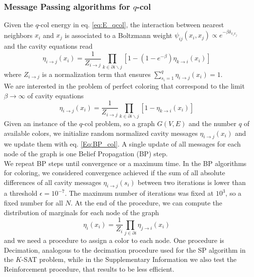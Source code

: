 \documentclass{article}
\begin{document}
\subsubsection{Message Passing algorithms for $q$-col}
Given the $q$-col energy in eq. \eqref{eq:E_qcol},
the interaction between nearest neighbors $x_i$ and $x_j$ is associated to a Boltzmann weight $\psi_{ij}(x_i,x_j) \propto e^{-\beta \delta_{x_i x_j}}$ and the cavity equations read \cite{Pearl1982}
\begin{equation}
    \eta_{i \rightarrow j} (x_i) = \frac{1}{Z_{i \rightarrow j}} \prod_{k \in \partial i\backslash j} [1-(1-e^{-\beta})\eta_{k \rightarrow i}(x_i)]
\end{equation} 
where $Z_{i \rightarrow j}$ is a normalization term that ensures $\sum_{s_i=1}^q \eta_{i\rightarrow j}(x_i) = 1$.
\\We are interested in the problem of perfect coloring that correspond to the limit $\beta \rightarrow \infty$ of cavity equations
\begin{equation}
    \eta_{i \rightarrow j} (x_i) = \frac{1}{Z_{i \rightarrow j}} \prod_{k \in \partial i\backslash j} [1-\eta_{k \rightarrow i}(x_i)]
    \label{Eq:BP_col}
\end{equation}
Given an instance of the $q$-col problem, so a graph $G(V,E)$ and the number $q$ of available colors, we initialize random normalized cavity messages $\eta_{i\rightarrow j}(x_i)$ and we update them with eq. \eqref{Eq:BP_col}. A single update of all messages for each node of the graph is one Belief Propagation (BP) step. 
\\We repeat BP steps until convergence or a maximum time. In the BP algorithms for coloring, we considered convergence achieved if the sum of all absolute differences of all cavity messages $\eta_{i\rightarrow j}(s_i)$ between two iterations is lower than a threshold $\epsilon=10^{-7}$. The maximum number of iterations was fixed at $10^3$, so a fixed number for all $N$. At the end of the procedure, we can compute the distribution of marginals for each node of the graph
\begin{equation}
    \eta_i(x_i) = \frac{1}{Z_i} \prod_{j\in \partial i} \eta_{j \rightarrow i} (x_i)
\end{equation}
and we need a procedure to assign a color to each node. One procedure is Decimation, analogous to the decimation procedure used for the SP algorithm in the $K$-SAT problem, while in the Supplementary Information we also test the Reinforcement procedure, that results to be less efficient. 
\end{document}
